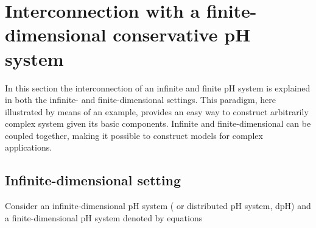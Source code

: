 \documentclass[letterpaper, 10 pt, conference]{ieeeconf}
\begin{document}
\section{Interconnection with a finite-dimensional conservative pH system}
\label{sec:Int}
In this section the interconnection of an infinite and finite pH system is explained in both the infinite- and finite-dimensional settings. This paradigm, here illustrated by means of an example, provides an easy way to construct arbitrarily complex system given its basic components. 
Infinite and finite-dimensional can be coupled together, making it possible to construct models for complex applications. 

\subsection{Infinite-dimensional setting}
Consider an infinite-dimensional pH system ( or distributed pH system, dpH) and a finite-dimensional pH system denoted by equations 
\end{document}
